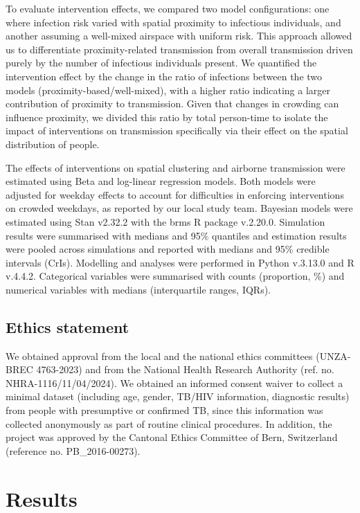 \documentclass[11pt]{article}
\begin{document}
To evaluate intervention effects, we compared two model configurations: one where infection risk varied with spatial proximity to infectious individuals, and another assuming a well-mixed airspace with uniform risk. This approach allowed us to differentiate proximity-related transmission from overall transmission driven purely by the number of infectious individuals present. We quantified the intervention effect by the change in the ratio of infections between the two models (proximity-based/well-mixed), with a higher ratio indicating a larger contribution of proximity to transmission. Given that changes in crowding can influence proximity, we divided this ratio by total person-time to isolate the impact of interventions on transmission specifically via their effect on the spatial distribution of people.

The effects of interventions on spatial clustering and airborne transmission were estimated using Beta and log-linear regression models. Both models were adjusted for weekday effects to account for difficulties in enforcing interventions on crowded weekdays, as reported by our local study team. Bayesian models were estimated using Stan v2.32.2 with the brms R package v.2.20.0. Simulation results were summarised with medians and 95\% quantiles and estimation results were pooled across simulations and reported with medians and 95\% credible intervals (CrIs). Modelling and analyses were performed in Python v.3.13.0 and R v.4.4.2. Categorical variables were summarised with counts (proportion, \%) and numerical variables with medians (interquartile ranges, IQRs).

\subsection{Ethics statement}\label{ethics-statement}

We obtained approval from the local and the national ethics committees (UNZA-BREC 4763-2023) and from the National Health Research Authority (ref. no. NHRA-1116/11/04/2024). We obtained an informed consent waiver to collect a minimal dataset (including age, gender, TB/HIV information, diagnostic results) from people with presumptive or confirmed TB, since this information was collected anonymously as part of routine clinical procedures. In addition, the project was approved by the Cantonal Ethics Committee of Bern, Switzerland (reference no. PB\_2016-00273).

\section{Results}\label{results}
\end{document}
